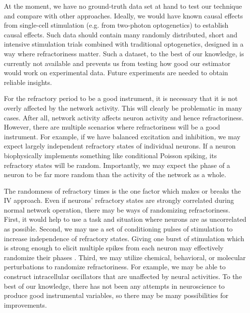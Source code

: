 \documentclass[11pt]{article}
\begin{document}
At the moment, we have no ground-truth data set at hand to test our technique and compare with other approaches. 
Ideally, we would have known causal effects from single-cell stimulation (e.g. from two-photon optogenetics) to establish causal effects. 
Such data should contain many randomly distributed, short and intensive stimulation trials combined with traditional optogenetics, designed in a way where refractoriness matter. 
Such a dataset, to the best of our knowledge, is currently not available and prevents us from testing how good our estimator would work on experimental data. 
Future experiments are needed to obtain reliable insights. 

For the refractory period to be a good instrument, it is necessary that it is not overly affected by the network activity. 
This will clearly be problematic in many cases. 
After all, network activity affects neuron activity and hence refractoriness. 
However, there are multiple scenarios where refractoriness will be a good instrument. 
For example, if we have balanced excitation and inhibition, we may expect largely independent refractory states of individual neurons. 
If a neuron biophysically implements something like conditional Poisson spiking, its refractory states will be random. 
Importantly, we may expect the phase of a neuron to be far more random than the activity of the network as a whole.

The randomness of refractory times is the one factor which makes or breaks the IV approach. 
Even if neurons' refractory states are strongly correlated during normal network operation, there may be ways of randomizing refractoriness. 
First, it would help to use a task and situation where neurons are as uncorrelated as possible. 
Second, we may use a set of conditioning pulses of stimulation to increase independence of refractory states. 
Giving one burst of stimulation which is strong enough to elicit multiple spikes from each neuron may effectively randomize their phases \citep{ermentrout2008reliability}.
Third, we may utilize chemical, behavioral, or molecular perturbations to randomize refractoriness. 
For example, we may be able to construct intracellular oscillators that are unaffected by neural activities. 
To the best of our knowledge, there has not been any attempts in neuroscience to produce good instrumental variables, so there may be many possibilities for improvements.
\end{document}
